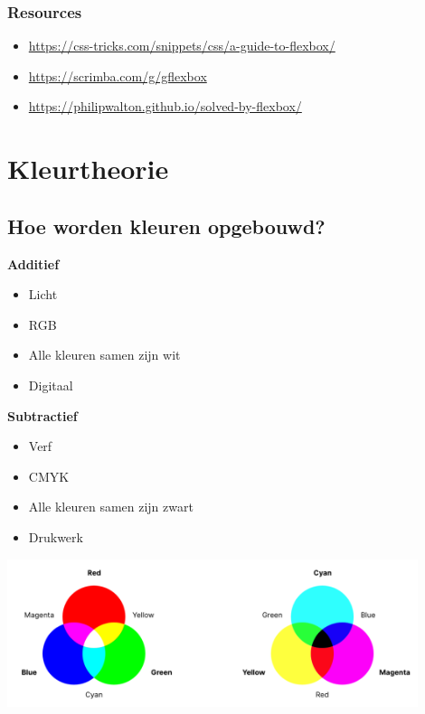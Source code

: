 \documentclass{article}
\newcommand{\bold}[1]{\textbf{#1}}
\begin{document}
\subsubsection{Resources}

\begin{itemize}
    \item \url{https://css-tricks.com/snippets/css/a-guide-to-flexbox/}
    \item \url{https://scrimba.com/g/gflexbox}
    \item \url{https://philipwalton.github.io/solved-by-flexbox/}
\end{itemize}


\section{Kleurtheorie}
\subsection{Hoe worden kleuren opgebouwd?}

\bold{Additief}
\begin{itemize}
    \item Licht
    \item RGB
    \item Alle kleuren samen zijn wit
    \item Digitaal
\end{itemize}

\bold{Subtractief}
\begin{itemize}
    \item Verf
    \item CMYK
    \item Alle kleuren samen zijn zwart
    \item Drukwerk
\end{itemize}

\includegraphics[width=0.9\textwidth]{img/Screenshot_20200217_083625.png}
\end{document}
